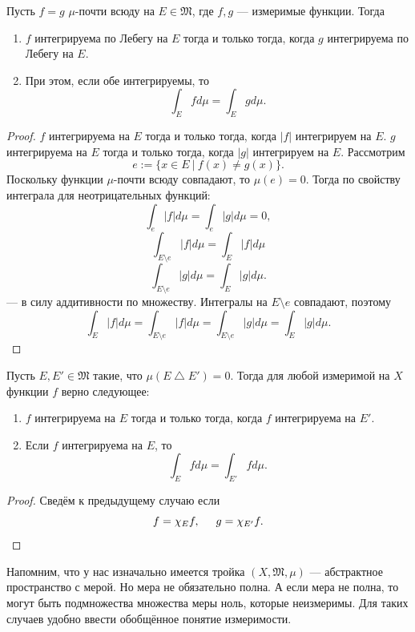 \begin{statement}
    Пусть $f = g$ $\mu$-почти всюду на $E \in \mathfrak{M}$, где $f,g$ — измеримые функции.
    Тогда
    \begin{enumerate}
        \item $f$ интегрируема по Лебегу на $E$ тогда и только тогда, когда $g$ интегрируема по Лебегу на $E$.
        \item При этом, если обе интегрируемы, то
        \[\int_E f d\mu = \int_E g d\mu.\]
    \end{enumerate}
\end{statement} 
\begin{proof}
    $f$ интегрируема на $E$ тогда и только тогда, когда $|f|$ интегрируем на $E$.
    $g$ интегрируема на $E$ тогда и только тогда, когда $|g|$ интегрируем на $E$.
    Рассмотрим
    \[e := \{x \in E \ | \ f(x) \neq g(x)\}.\]
    Поскольку функции $\mu$-почти всюду совпадают, то $\mu(e) = 0$.
    Тогда по свойству интеграла для неотрицательных функций:
    \[\int_e |f| d\mu = \int_e |g| d\mu = 0,\]
    \[\int_{E \setminus e} |f| d\mu = \int_E |f| d\mu\]
    \[\int_{E \setminus e} |g| d\mu = \int_E |g| d\mu.\]
    — в силу аддитивности по множеству.
    Интегралы на $E \setminus e$ совпадают, поэтому
    \[\int_E |f| d\mu = \int_{E \setminus e} |f| d\mu = \int_{E \setminus e} |g| d\mu = \int_E |g| d\mu.\]
\end{proof} 

\begin{statement}
    Пусть $E, E' \in \mathfrak{M}$ такие, что $\mu(E \bigtriangleup E') = 0$.
    Тогда для любой измеримой на $X$ функции $f$ верно следующее:
    \begin{enumerate}
        \item $f$ интегрируема на $E$ тогда и только тогда, когда $f$ интегрируема на $E'$.
        \item Если $f$ интегрируема на $E$, то
        \[\int_E f d\mu = \int_{E'} f d\mu.\]
    \end{enumerate}
\end{statement} 
\begin{proof}
    Сведём к предыдущему случаю если
    \[f = \chi_E f, \hspace*{.5cm} g = \chi_{E'} f.\]
\end{proof} 

Напомним, что у нас изначально имеется тройка $(X, \mathfrak{M}, \mu)$ — абстрактное пространство с мерой.
Но мера не обязательно полна.
А если мера не полна, то могут быть подмножества множества меры ноль, которые неизмеримы.
Для таких случаев удобно ввести обобщённое понятие измеримости.


